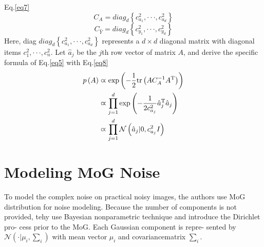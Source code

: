\documentclass[10pt,twocolumn,letterpaper]{article}
\begin{document}
Eq.\ref{eq7}
\begin{equation}
C_A = diag_d \left\lbrace c^2_{a_1},\cdot\cdot\cdot,c^2_{a_d}\right\rbrace 
\label{eq6}
\end{equation}
\begin{equation}
C_{\hat{Y}} = diag_d \left\lbrace c^2_{y_1},\cdot\cdot\cdot,c^2_{y_d}\right\rbrace 
\label{eq7}
\end{equation}
Here, diag $diag_d \left\lbrace c^2_{a_1},\cdot\cdot\cdot,c^2_{a_d}\right\rbrace$ represents a $d \times d$ diagonal matrix
with diagonal items $c_1^2,\cdot\cdot\cdot,c^2_n$. Let $\hat{a}_j$ be the $j$th row vector of matrix $A$, and derive the specific formula of Eq.\ref{eq5} 
with Eq.\ref{eq8}
\begin{equation}
\begin{aligned}
p\left(A\right) &\varpropto {\rm exp}\left(-\frac{1}{2}{\rm tr}\left(AC_A^{-1}A^\mathrm{T}\right)\right) \\
& \varpropto \prod_{j=1}^d {\rm exp}\left(-\frac{1}{2c^2_{a_j}}\hat{a}_j^\mathrm{T}\hat{a}_j\right)\\
& \varpropto \prod_{j=1}^{d} \mathcal{N}\left(\hat{a}_j|0,c^2_{a_j}I\right)
\end{aligned}
\label{eq8}
\end{equation}
\section{Modeling MoG Noise}
To model the complex noise on practical noisy images,
the authors use MoG distribution for noise modeling. Because the
number of components is not provided, tehy use Bayesian
nonparametric technique and introduce the Dirichlet pro-
cess prior to the MoG. Each Gaussian component is repre-
sented by $\mathcal{N}\left(\cdot|\mu_i,\sum_{i}\right)$ with 
mean vector $\mu_i$ and covariancematrix $\sum_{i}$.

{\small
	
	
}
\end{document}

